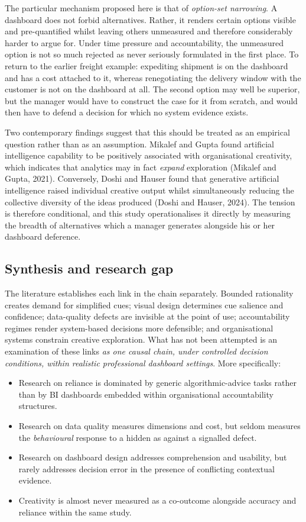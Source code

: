 \documentclass[11pt,a4paper]{article}
\numberwithin{figure}{section}
\numberwithin{table}{section}
\newcommand{\ct}[1]{\textcolor{citeblue}{#1}}          %
\begin{document}
The particular mechanism proposed here is that of \emph{option-set narrowing}. A dashboard does not
forbid alternatives. Rather, it renders certain options visible and pre-quantified whilst leaving
others unmeasured and therefore considerably harder to argue for. Under time pressure and
accountability, the unmeasured option is not so much rejected as never seriously formulated in the
first place. To return to the earlier freight example: expediting shipment is on the dashboard and
has a cost attached to it, whereas renegotiating the delivery window with the customer is not on
the dashboard at all. The second option may well be superior, but the manager would have to
construct the case for it from scratch, and would then have to defend a decision for which no
system evidence exists.

Two contemporary findings suggest that this should be treated as an empirical question rather than
as an assumption. Mikalef and Gupta found artificial intelligence capability to be positively
associated with organisational creativity, which indicates that analytics may in fact
\emph{expand} exploration \ct{(Mikalef and Gupta, 2021)}. Conversely, Doshi and Hauser found that
generative artificial intelligence raised individual creative output whilst simultaneously
reducing the collective diversity of the ideas produced \ct{(Doshi and Hauser, 2024)}. The tension
is therefore conditional, and this study operationalises it directly by measuring the breadth of
alternatives which a manager generates alongside his or her dashboard deference.

\subsection{Synthesis and research gap}

The literature establishes each link in the chain separately. Bounded rationality creates demand
for simplified cues; visual design determines cue salience and confidence; data-quality defects are
invisible at the point of use; accountability regimes render system-based decisions more
defensible; and organisational systems constrain creative exploration. What has not been attempted
is an examination of these links \emph{as one causal chain, under controlled decision conditions,
within realistic professional dashboard settings}. More specifically:

\begin{itemize}[leftmargin=*,itemsep=1pt,topsep=4pt]
\item Research on reliance is dominated by generic algorithmic-advice tasks rather than by BI
dashboards embedded within organisational accountability structures.
\item Research on data quality measures dimensions and cost, but seldom measures the
\emph{behavioural} response to a hidden as against a signalled defect.
\item Research on dashboard design addresses comprehension and usability, but rarely addresses
decision error in the presence of conflicting contextual evidence.
\item Creativity is almost never measured as a co-outcome alongside accuracy and reliance within
the same study.
\end{itemize}
\end{document}
